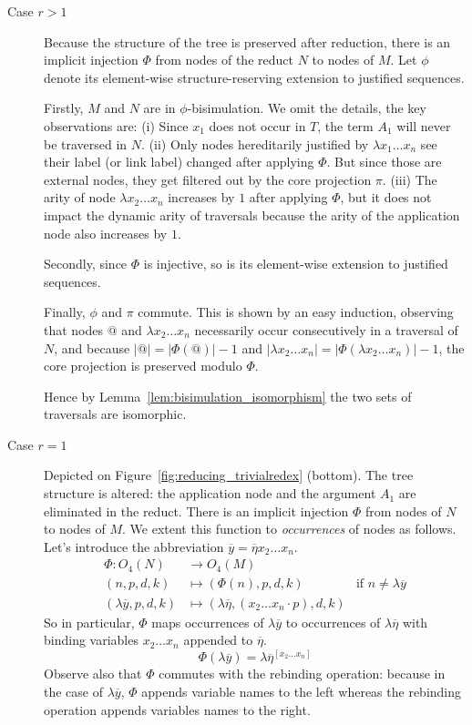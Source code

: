 \documentclass{elsarticle}
\theoremstyle{plain}
\theoremstyle{definition}
\theoremstyle{remark}
\def\coresymbol{\pi} %
\begin{document}
    \begin{description}
    \item[Case $r>1$] Because the structure of the tree is preserved after reduction, there is an implicit injection $\Phi$ from nodes of the reduct $N$ to nodes of $M$. Let $\phi$ denote its element-wise structure-reserving  extension to justified sequences.

    Firstly, $M$ and $N$ are in $\phi$-bisimulation. We omit the details, the key observations are:
    (i) Since $x_1$ does not occur in $T$, the term $A_1$ will never be traversed in $N$.
    (ii) Only nodes hereditarily justified by $\lambda x_1 \ldots x_n$ see their label (or link label) changed after applying $\Phi$. But since those are external nodes, they get filtered out by the core projection $\coresymbol$.
    (iii) The arity of node $\lambda x_2 \ldots x_n$ increases by $1$ after applying $\Phi$, but it does not impact the dynamic arity of traversals because the arity of the application node also increases by $1$.

    Secondly, since $\Phi$ is injective, so is its element-wise extension to justified sequences.

    Finally, $\phi$ and $\coresymbol$ commute. This is shown by an easy induction, observing that nodes $@$ and $\lambda x_2\ldots x_n$ necessarily occur consecutively in a traversal of $N$, and because $|@| = |\Phi(@)| -1$ and $|\lambda x_2\ldots x_n| = |\Phi(\lambda x_2\ldots x_n)| - 1$, the core projection is preserved modulo $\Phi$.

    Hence by Lemma~\ref{lem:bisimulation_isomorphism} the two sets of traversals are isomorphic.

    \item[Case $r=1$] Depicted on Figure~\ref{fig:reducing_trivialredex} (bottom). The tree structure is altered: the application node and the argument $A_1$ are eliminated in the reduct. There is an implicit injection $\Phi$ from nodes of $N$ to nodes of $M$. We extent this function to \emph{occurrences} of nodes as follows. Let's introduce the abbreviation $\overline{y} = \overline\eta x_2 \ldots x_n$.
    \begin{align*}
        \Phi\colon O_4(N) &\rightarrow O_4(M) \\
        (n,p,d,k) &\longmapsto (\Phi(n),p,d,k) & \mbox{if $n\neq\lambda\overline{y}$} \\
        (\lambda\overline{y},p,d,k) &\longmapsto (\lambda\overline\eta,(x_2 \ldots x_n \cdot p),d,k)
    \end{align*}
    So in particular, $\Phi$ maps occurrences of $\lambda\overline{y}$ to occurrences of $\lambda\overline\eta$ with binding variables $x_2 \ldots x_n$ appended to $\overline\eta$.
    \begin{equation}
        \Phi(\lambda\overline{y})
        =
        \lambda\overline\eta^{[x_2\ldots x_n]}
        \label{eqn:phi_maps_lambday_to_lambdaeta}
    \end{equation}
    Observe also that $\Phi$ commutes with the rebinding operation: because in the case of $\lambda\overline{y}$, $\Phi$ appends variable names to the left whereas the rebinding operation appends variables names to the right.


\end{description}
\end{document}
